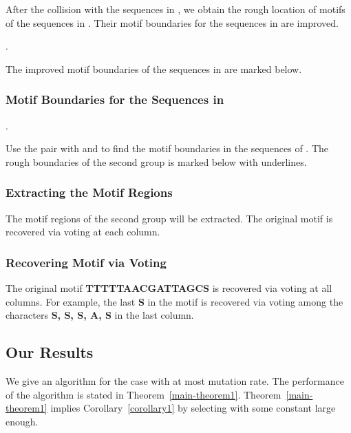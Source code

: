 \documentclass[11pt]{article}
\begin{document}
After the collision with the sequences in , we obtain the rough
location of motifs of the sequences in . Their motif boundaries
for the sequences in  are improved.

.

The improved motif boundaries of the sequences in  are marked
below.



\subsubsection{Motif Boundaries for the Sequences in }

.

Use the pair  with  and
 to find the motif boundaries in the
sequences of . The rough boundaries of the second group is
marked below with underlines.









\subsubsection{Extracting the Motif Regions}

The motif regions of the second group will be extracted. The
original motif is recovered via voting at each column.



\subsubsection{Recovering Motif via Voting}

The original motif {\bf TTTTTAACGATTAGCS} is recovered via voting at
all columns. For example, the last {\bf S} in the motif is recovered
via voting among the characters {\bf S, S, S, A, S} in the last
column.

\subsection{Our Results}

We give an algorithm for the case with at most  mutation rate. The performance of the algorithm is
stated in Theorem~\ref{main-theorem1}. Theorem~\ref{main-theorem1}
implies Corollary~\ref{corollary1} by selecting  with
some constant  large enough.
\end{document}
